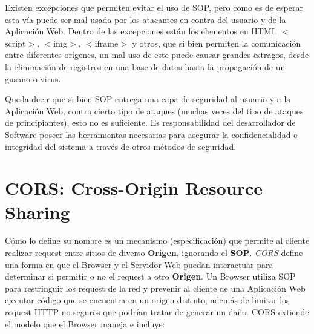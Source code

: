     Existen excepciones que permiten evitar el uso de SOP, pero como es de esperar esta vía puede ser mal usada por los atacantes en contra del usuario y de la Aplicación Web. Dentro de las excepciones están los elementos en HTML \(<\)script\(>\), \(<\)img\(>\), \(<\)iframe\(>\) y otros, que si bien permiten la comunicación entre diferentes orígenes, un mal uso de este puede causar grandes estragos, desde la eliminación de registros en una base de datos hasta la propagación de un gusano o virus.
        
    Queda decir que si bien SOP entrega una capa de seguridad al usuario y a la Aplicación Web, contra cierto tipo de ataques (muchas veces del tipo de ataques de principiantes), esto no es suficiente. Es responsabilidad del desarrollador de Software poseer las herramientas necesarias para asegurar la confidencialidad e integridad del sistema a través de otros métodos de seguridad.



\section{CORS: Cross-Origin Resource Sharing}
\label{chap2:CORS}
    Cómo lo define su nombre es un mecanismo (especificación) que permite al cliente realizar request entre sitios de diverso \textbf{Origen}, ignorando el \textbf{SOP}. \textit{CORS} define una forma en que el Browser y el Servidor Web puedan interactuar para determinar si permitir o no el request a otro \textbf{Origen}. Un Browser utiliza SOP para restringuir los request de la red y prevenir al cliente de una Aplicación Web ejecutar código que se encuentra en un origen distinto, además de limitar los request HTTP no seguros que podrían tratar de generar un daño. CORS extiende el modelo que el Browser maneja e incluye:
        
